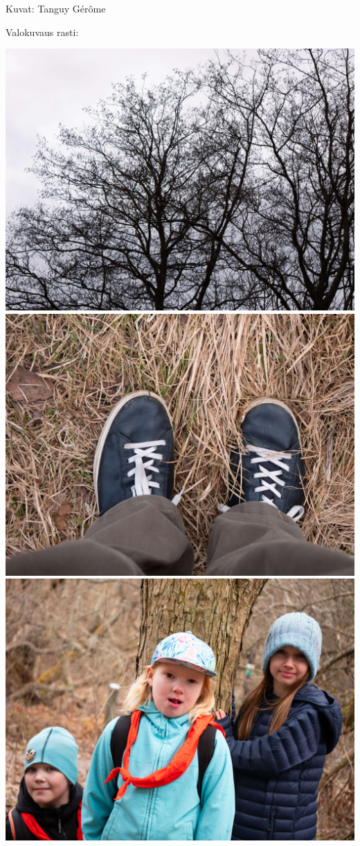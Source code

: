 \documentclass[10pt,finnish,a5paper,headings=small,twoside=semi]{scrartcl}
\begin{document}
\medskip
\noindent\null\hfill Kuvat: Tanguy Gérôme

\clearpage

Valokuvaus rasti:

\begin{multicols}{2}

	\centering
	\noindent\includegraphics[width=0.9\linewidth]{assets/kolkkienpäiväretki4}
	\noindent\includegraphics[width=0.9\linewidth]{assets/kolkkienpäiväretki5}
	\noindent\includegraphics[width=0.9\linewidth]{assets/kolkkienpäiväretki6}

\end{multicols}
\end{document}
